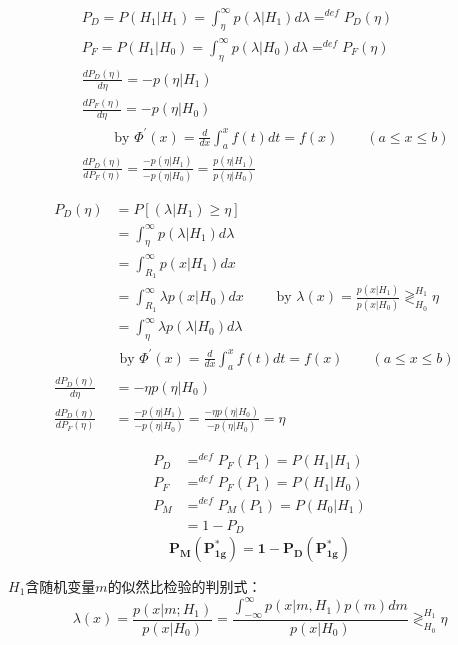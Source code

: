 \begin{frame}[shrink]
\begin{align*}
&P_D=P(H_1|H_1)=\int_{\eta}^{\infty}p(\lambda|H_1)d\lambda\mathop{=}^{def}P_D(\eta) \\
&P_F =P(H_1|H_0)=\int_{\eta}^{\infty}p(\lambda|H_0)d\lambda\mathop
{=}^{def}P_F(\eta) \\
&\frac{dP_D(\eta)}{d\eta} =-p(\eta|H_1) \\ 
&\frac{dP_F(\eta)}{d\eta} =-p(\eta|H_0) \\ 
&\qquad \text{ by } \Phi^\prime(x)=\frac{d}{dx}\int_a^xf(t)dt=f(x)\qquad (a\le x\le b) \\
&\frac{dP_D(\eta)}{dP_F(\eta)} =\frac{-p(\eta|H_1)}{-p(\eta|H_0)}=\frac{p(\eta|H_1)}{p(\eta|H_0)}
\end{align*}
\end{frame}

\begin{frame}
\begin{align*}
P_D(\eta) &=P[(\lambda|H_1)\ge\eta]&\\
&=\int_{\eta}^{\infty}p(\lambda|H_1)d\lambda&\\
&=\int_{R_1}^{\infty}p(x|H_1)dx&\\
&=\int_{R_1}^{\infty}\lambda p(x|H_0)dx \qquad \text{ by }\lambda(x)=\frac{p(x|H_1)}{p(x|H_0)}\mathop{\gtrless}_{H_0}^{H_1}\eta&\\
&=\int_{\eta}^{\infty}\lambda p(\lambda|H_0)d\lambda&\\
&\text{ by } \Phi^\prime(x)=\frac{d}{dx}\int_a^xf(t)dt=f(x)\qquad (a\le x\le b) \\
\frac{dP_D(\eta)}{d\eta} &=-\eta p(\eta|H_0)\\
\frac{dP_D(\eta)}{dP_F(\eta)} &=\frac{-p(\eta|H_1)}{-p(\eta|H_0)}=\frac{-\eta p(\eta|H_0)}{-p(\eta|H_0)}=\eta
\end{align*}
\end{frame}

\begin{frame}
\begin{align*}
P_D &\mathop{=}^{def}P_F(P_1)=P(H_1|H_1)\\
P_F &\mathop{=}^{def}P_F(P_1)=P(H_1|H_0)\\
P_M &\mathop{=}^{def}P_M(P_1)=P(H_0|H_1)\\
&=1-P_D
\end{align*}
\[\bm{P_M(P_{1g}^\ast)=1-P_D(P_{1g}^\ast)} \]
\end{frame}

\begin{frame}
$H_1$含随机变量$m$的似然比检验的判别式：
\[\lambda(x)=\frac{p(x|m; H_1)}{p(x|H_0)}=\frac{\int_{-\infty}^{\infty}p(x|m,H_1)p(m)dm}{p(x|H_0)}\mathop{\gtrless}_{H_0}^{H_1}\eta \]
\end{frame}


